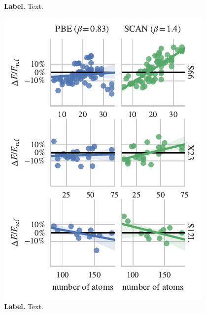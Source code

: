 \begin{figure}
{
}
\caption{\textbf{Label.}
Text.
\label{fig:param-fitting}
}
\end{figure}

\begin{figure}
\centering
\includegraphics{../media/size-dependence}
\caption{\textbf{Label.}
Text.
\label{fig:size-dependence}
}
\end{figure}

